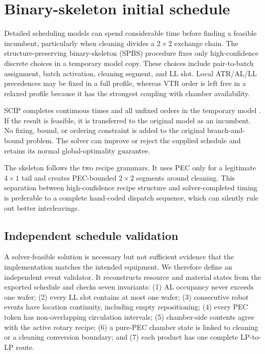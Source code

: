 \documentclass[5p,times,procedia]{elsarticle}
\begin{document}
\section{Binary-skeleton initial schedule}

Detailed scheduling models can spend considerable time before finding a feasible incumbent, particularly when cleaning divides a $2\times2$ exchange chain. The structure-preserving binary-skeleton (SPBS) procedure fixes only high-confidence discrete choices in a temporary model copy. These choices include pair-to-batch assignment, batch activation, cleaning segment, and LL slot. Local ATR/AL/LL precedences may be fixed in a full profile, whereas VTR order is left free in a relaxed profile because it has the strongest coupling with chamber availability.

SCIP completes continuous times and all unfixed orders in the temporary model \cite{bestuzheva2023scip}. If the result is feasible, it is transferred to the original model as an incumbent. No fixing, bound, or ordering constraint is added to the original branch-and-bound problem. The solver can improve or reject the supplied schedule and retains its normal global-optimality guarantee.

The skeleton follows the two recipe grammars. It uses PEC only for a legitimate $4\times1$ tail and creates PEC-bounded $2\times2$ segments around cleaning. This separation between high-confidence recipe structure and solver-completed timing is preferable to a complete hand-coded dispatch sequence, which can silently rule out better interleavings.

\subsection{Independent schedule validation}

A solver-feasible solution is necessary but not sufficient evidence that the implementation matches the intended equipment. We therefore define an independent event validator. It reconstructs resource and material states from the exported schedule and checks seven invariants: (1) AL occupancy never exceeds one wafer; (2) every LL slot contains at most one wafer; (3) consecutive robot events have location continuity, including empty repositioning; (4) every PEC token has non-overlapping circulation intervals; (5) chamber-side contents agree with the active rotary recipe; (6) a pure-PEC chamber state is linked to cleaning or a cleaning conversion boundary; and (7) each product has one complete LP-to-LP route.
\end{document}
